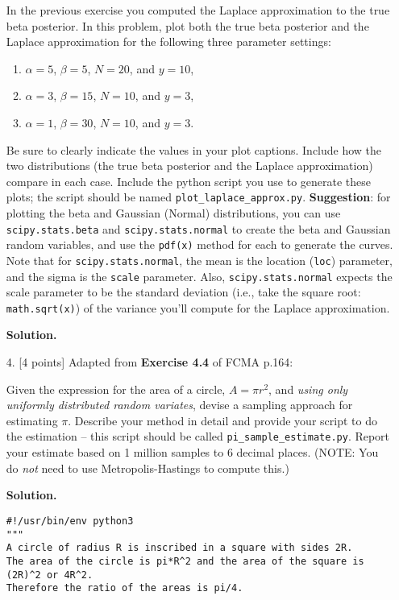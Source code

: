 \documentclass[10pt]{article}
\begin{document}
\begin{itemize}
In the previous exercise you computed the Laplace approximation to the true beta posterior.  In this problem, plot both the true beta posterior and the Laplace approximation for the following three parameter settings:
\begin{enumerate}
\item $\alpha = 5$, $\beta = 5$, $N = 20$, and $y = 10$,
\item $\alpha = 3$, $\beta = 15$, $N = 10$, and $y = 3$,
\item $\alpha = 1$, $\beta = 30$, $N = 10$, and $y = 3$.
\end{enumerate}
Be sure to clearly indicate the values in your plot captions.  Include how the two distributions (the true beta posterior and the Laplace approximation) compare in each case.  Include the python script you use to generate these plots; the script should be named {\tt plot\_laplace\_approx.py}.  {\bf Suggestion}: for plotting the beta and Gaussian (Normal) distributions, you can use {\tt scipy.stats.beta} and {\tt scipy.stats.normal} to create the beta and Gaussian random variables, and use the {\tt pdf(x)} method for each to generate the curves.  Note that for {\tt scipy.stats.normal}, the mean is the location ({\tt loc}) parameter, and the sigma is the {\tt scale} parameter.  Also, {\tt scipy.stats.normal} expects the scale parameter to be the standard deviation (i.e., take the square root: {\tt math.sqrt(x)}) of the variance you'll compute for the Laplace approximation.


{\bf Solution.}




\item[4.]  [4 points]
Adapted from {\bf Exercise 4.4} of FCMA p.164:

Given the expression for the area of a circle, $A = \pi r^2$, and {\em using only uniformly distributed random variates}, devise a sampling approach for estimating $\pi$.  Describe your method in detail and provide your script to do the estimation -- this script should be called {\tt pi\_sample\_estimate.py}.  Report your estimate based on 1 million samples to 6 decimal places.  (NOTE: You do {\em not} need to use Metropolis-Hastings to compute this.)

{\bf Solution.} %

\begin{verbatim}
#!/usr/bin/env python3
"""
A circle of radius R is inscribed in a square with sides 2R.
The area of the circle is pi*R^2 and the area of the square is (2R)^2 or 4R^2.
Therefore the ratio of the areas is pi/4.


\end{verbatim}
\end{itemize}
\end{document}
